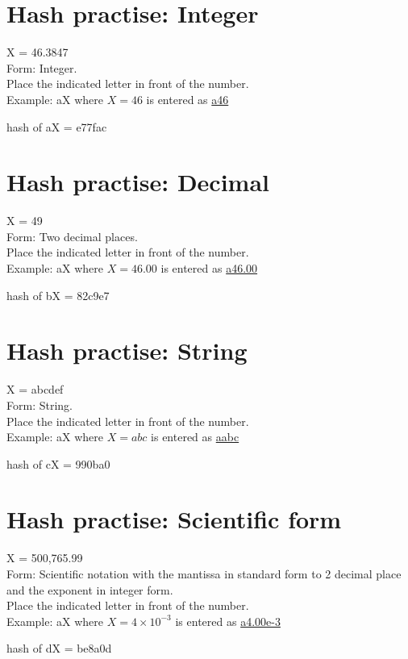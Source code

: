 \section{Hash practise: Integer}

X = 46.3847\\
Form: Integer.\\
Place the indicated letter in front of the number.\\
Example: aX where $X=46$ is entered as \href{http://www.wolframalpha.com/input/?i=md5+hash+of+\%22a46\%22}{a46}

hash of aX = e77fac

\section{Hash practise: Decimal}

X = 49\\
Form: Two decimal places.\\
Place the indicated letter in front of the number.\\
Example: aX where $X=46.00$ is entered as \href{http://www.wolframalpha.com/input/?i=md5+hash+of+\%22a46\%22}{a46.00}

hash of bX = 82c9e7

\section{Hash practise: String}

X = abcdef\\
Form: String.\\
Place the indicated letter in front of the number.\\
Example: aX where $X=abc$ is entered as \href{http://www.wolframalpha.com/input/?i=md5+hash+of+\%22aabc\%22}{aabc}

hash of cX = 990ba0

\section{Hash practise: Scientific form}

X = 500,765.99\\
Form: Scientific notation with the mantissa in standard form to 2 decimal place and the exponent in integer form.\\
Place the indicated letter in front of the number.\\
Example: aX where $X=4 \times 10^{-3}$ is entered as \href{http://www.wolframalpha.com/input/?i=md5+hash+of+\%22a4.00e-3\%22}{a4.00e-3}

hash of dX = be8a0d

